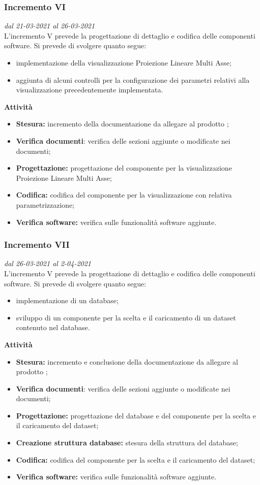 \subsubsection{Incremento VI}
\textit{dal 21-03-2021 al 26-03-2021}\\
L'incremento V prevede la progettazione di dettaglio e codifica delle componenti software. Si prevede di svolgere quanto segue:
\begin{itemize}
\item implementazione della visualizzazione Proiezione Lineare Multi Asse;
\item aggiunta di alcuni controlli per la configurazione dei parametri relativi alla visualizzazione precedentemente implementata.
\end{itemize}
\textbf{Attività}
\begin{itemize}
\item \textbf{Stesura:} incremento della documentazione da allegare al prodotto ;
\item \textbf{Verifica documenti}: verifica delle sezioni aggiunte o modificate nei documenti;
\item \textbf{Progettazione:} progettazione del componente per la visualizzazione Proiezione Lineare Multi Asse;
\item \textbf{Codifica:} codifica del componente per la visualizzazione con relativa parametrizzazione;
\item \textbf{Verifica software:} verifica sulle funzionalità software aggiunte.
\end{itemize}

\subsubsection{Incremento VII}
\textit{dal 26-03-2021 al 2-04-2021}\\
L'incremento V prevede la progettazione di dettaglio e codifica delle componenti software. Si prevede di svolgere quanto segue:
\begin{itemize}
\item implementazione di un database;
\item sviluppo di un componente per la scelta e il caricamento di un dataset contenuto nel database.
\end{itemize}
\textbf{Attività}
\begin{itemize}
\item \textbf{Stesura:} incremento e conclusione della documentazione da allegare al prodotto ;
\item \textbf{Verifica documenti}: verifica delle sezioni aggiunte o modificate nei documenti;
\item \textbf{Progettazione:} progettazione del database e del componente per la scelta e il caricamento del dataset;
\item \textbf{Creazione struttura database:} stesura della struttura del database;
\item \textbf{Codifica:} codifica del componente per la scelta e il caricamento del dataset;
\item \textbf{Verifica software:} verifica sulle funzionalità software aggiunte.
\end{itemize}


